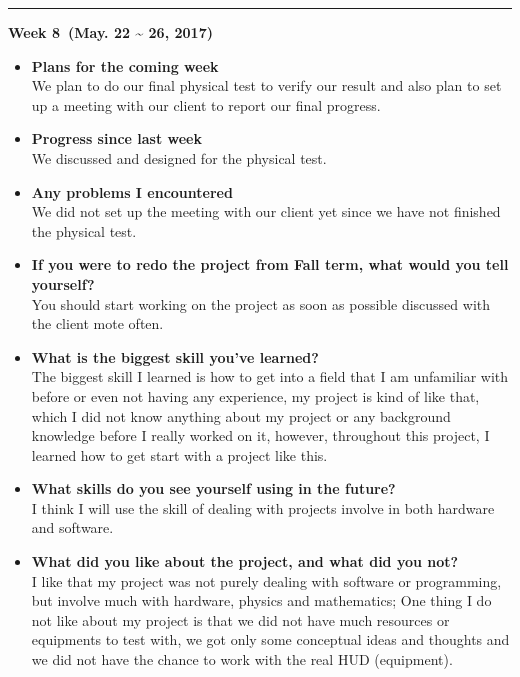 	\rule{\textwidth}{0.5pt}

	\begin{center}
		\textbf{Week 8 (May. 22 {\textasciitilde{}} 26, 2017)}
	\end{center}
	\begin{itemize}
		\item \textbf{Plans for the coming week}
		\\We plan to do our final physical test to verify our result and also plan to set up a meeting with our client to report our final progress.\\

		\item \textbf{Progress since last week}
		\\We discussed and designed for the physical test.\\

		\item \textbf{Any problems I encountered}
		\\We did not set up the meeting with our client yet since we have not finished the physical test.\\

		\item \textbf{If you were to redo the project from Fall term, what would you tell yourself?}
		\\You should start working on the project as soon as possible discussed with the client mote often.\\

		\item \textbf{What is the biggest skill you've learned?}
		\\The biggest skill I learned is how to get into a field that I am unfamiliar with before or even not having any experience, my project is kind of like that, which I did not know anything about my project or any background knowledge before I really worked on it, however, throughout this project, I learned how to get start with a project like this.\\

		\item \textbf{What skills do you see yourself using in the future?}
		\\I think I will use the skill of dealing with projects involve in both hardware and software.\\

		\item \textbf{What did you like about the project, and what did you not?}
		\\I like that my project was not purely dealing with software or programming, but involve much with hardware, physics and mathematics; One thing I do not like about my project is that we did not have much resources or equipments to test with, we got only some conceptual ideas and thoughts and we did not have the chance to work with the real HUD (equipment).\\


\end{itemize}
